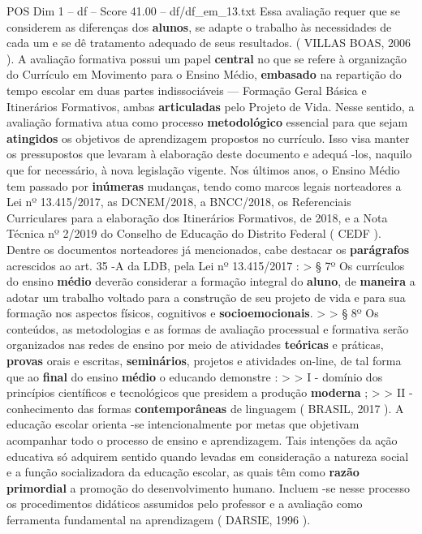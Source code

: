 \begin{textsample}{POS Dim 1 – df – Score 41.00 – df/df\_em\_13.txt}
Essa avaliação requer que se considerem as diferenças dos \textbf{alunos}, se adapte o trabalho às necessidades de cada um e se dê tratamento adequado de seus resultados. ( VILLAS BOAS, 2006 ).
A avaliação formativa possui um papel \textbf{central} no que se refere à organização do Currículo em Movimento para o Ensino Médio, \textbf{embasado} na repartição do tempo escolar em duas partes indissociáveis — Formação Geral Básica e Itinerários Formativos, ambas \textbf{articuladas} pelo Projeto de Vida.
Nesse sentido, a avaliação formativa atua como processo \textbf{metodológico} essencial para que sejam \textbf{atingidos} os objetivos de aprendizagem propostos no currículo.
Isso visa manter os pressupostos que levaram à elaboração deste documento e adequá -los, naquilo que for necessário, à nova legislação vigente.
Nos últimos anos, o Ensino Médio tem passado por \textbf{inúmeras} mudanças, tendo como marcos legais norteadores a Lei nº 13.415/2017, as DCNEM/2018, a BNCC/2018, os Referenciais Curriculares para a elaboração dos Itinerários Formativos, de 2018, e a Nota Técnica nº 2/2019 do Conselho de Educação do Distrito Federal ( CEDF ).
Dentre os documentos norteadores já mencionados, cabe destacar os \textbf{parágrafos} acrescidos ao art. 35 -A da LDB, pela Lei nº 13.415/2017 : > § 7º Os currículos do ensino \textbf{médio} deverão considerar a formação integral do \textbf{aluno}, de \textbf{maneira} a adotar um trabalho voltado para a construção de seu projeto de vida e para sua formação nos aspectos físicos, cognitivos e \textbf{socioemocionais}. > > § 8º Os conteúdos, as metodologias e as formas de avaliação processual e formativa serão organizados nas redes de ensino por meio de atividades \textbf{teóricas} e práticas, \textbf{provas} orais e escritas, \textbf{seminários}, projetos e atividades on-line, de tal forma que ao \textbf{final} do ensino \textbf{médio} o educando demonstre : > > I - domínio dos princípios científicos e tecnológicos que presidem a produção \textbf{moderna} ; > > II - conhecimento das formas \textbf{contemporâneas} de linguagem ( BRASIL, 2017 ).
A educação escolar orienta -se intencionalmente por metas que objetivam acompanhar todo o processo de ensino e aprendizagem.
Tais intenções da ação educativa só adquirem sentido quando levadas em consideração a natureza social e a função socializadora da educação escolar, as quais têm como \textbf{razão} \textbf{primordial} a promoção do desenvolvimento humano.
Incluem -se nesse processo os procedimentos didáticos assumidos pelo professor e a avaliação como ferramenta fundamental na aprendizagem ( DARSIE, 1996 ).

\end{textsample}
